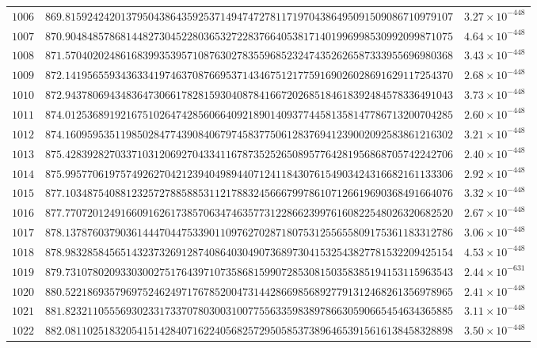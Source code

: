 \documentclass[12pt,reqno]{amsart}
\theoremstyle{remark}
\begin{document}
\begin{longtable}{clc}
$1006$ & $869.8159242420137950438643592537149474727811719704386495091509086710979107$ & $3.27\times 10^{-448}$ \\
$1007$ & $870.9048485786814482730452280365327228376640538171401996998530992099871075$ & $4.64\times 10^{-448}$ \\
$1008$ & $871.5704020248616839935395710876302783559685232474352626587333955696980368$ & $3.43\times 10^{-448}$ \\
$1009$ & $872.1419565593436334197463708766953714346751217759169026028691629117254370$ & $2.68\times 10^{-448}$ \\
$1010$ & $872.9437806943483647306617828159304087841667202685184618392484578336491043$ & $3.73\times 10^{-448}$ \\
$1011$ & $874.0125368919216751026474285606640921890140937744581358147786713200704285$ & $2.60\times 10^{-448}$ \\
$1012$ & $874.1609595351198502847743908406797458377506128376941239002092583861216302$ & $3.21\times 10^{-448}$ \\
$1013$ & $875.4283928270337103120692704334116787352526508957764281956868705742242706$ & $2.40\times 10^{-448}$ \\
$1014$ & $875.9957706197574926270421239404989440712411843076154903424316682161133306$ & $2.92\times 10^{-448}$ \\
$1015$ & $877.1034875408812325727885885311217883245666799786107126619690368491664076$ & $3.32\times 10^{-448}$ \\
$1016$ & $877.7707201249166091626173857063474635773122866239976160822548026320682520$ & $2.67\times 10^{-448}$ \\
$1017$ & $878.1378760379036144470447533901109762702871807531255655809175361183312786$ & $3.06\times 10^{-448}$ \\
$1018$ & $878.9832858456514323732691287408640304907368973041532543827781532209425154$ & $4.53\times 10^{-448}$ \\
$1019$ & $879.7310780209330300275176439710735868159907285308150358385194153115963543$ & $2.44\times 10^{-631}$ \\
$1020$ & $880.5221869357969752462497176785200473144286698568927791312468261356978965$ & $2.41\times 10^{-448}$ \\
$1021$ & $881.8232110555693023317337078030031007755633598389786630590665454634365885$ & $3.11\times 10^{-448}$ \\
$1022$ & $882.0811025183205415142840716224056825729505853738964653915616138458328898$ & $3.50\times 10^{-448}$ \\

\end{longtable}
\end{document}

